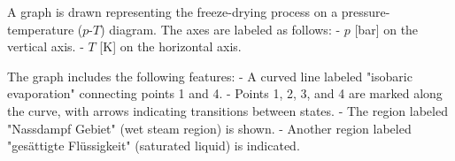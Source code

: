 A graph is drawn representing the freeze-drying process on a pressure-temperature (\( p \)-\( T \)) diagram. The axes are labeled as follows:  
- \( p \) [bar] on the vertical axis.  
- \( T \) [K] on the horizontal axis.  

The graph includes the following features:  
- A curved line labeled "isobaric evaporation" connecting points 1 and 4.  
- Points 1, 2, 3, and 4 are marked along the curve, with arrows indicating transitions between states.  
- The region labeled "Nassdampf Gebiet" (wet steam region) is shown.  
- Another region labeled "gesättigte Flüssigkeit" (saturated liquid) is indicated.